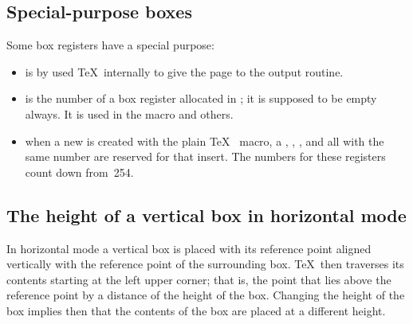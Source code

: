 \documentclass{book}
\begin{document}
\subsection{Special-purpose boxes}

Some   box registers
have a special
purpose:
\begin{itemize}
\item {} is by used \TeX\ internally
 to give the page to the output routine.
\item {} is the number of
 a box register allocated in
 ; it is supposed to be empty always.
 It is used in the macro  and others.
\item when a new  is created with the plain \TeX\
  macro, a ,
 , , and  all with the same number
 are reserved for that insert.
 The numbers for these registers count down from~254.
\end{itemize}


\subsection{The height of a vertical box in horizontal mode}

In horizontal mode a vertical box is placed with its
reference point aligned vertically with the reference
point of the surrounding box.
\TeX\ then traverses its contents starting at the left
upper corner; that is, the point that lies above the reference
point by a distance of the height of the box.
Changing the height of the box  implies then that the
contents of the box are placed at a different height.
\end{document}
